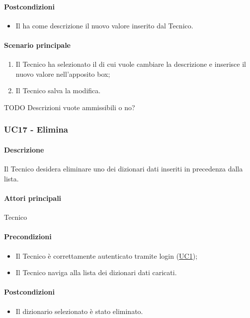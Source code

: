 \paragraph*{Postcondizioni}
\begin{itemize}
  \item Il  ha come descrizione il nuovo valore inserito dal Tecnico.
\end{itemize}
\paragraph*{Scenario principale}
\begin{enumerate}
  \item Il Tecnico ha selezionato il  di cui vuole cambiare la descrizione e inserisce il nuovo valore nell’apposito box;
  \item Il Tecnico salva la modifica.
\end{enumerate}

TODO Descrizioni vuote ammissibili o no?


\subsubsection{UC17 - Elimina }\label{UC17}
\paragraph*{Descrizione} Il Tecnico desidera eliminare uno dei dizionari dati inseriti in precedenza dalla lista.

\paragraph*{Attori principali} Tecnico

\paragraph*{Precondizioni}
\begin{itemize}
  \item Il Tecnico è correttamente autenticato tramite login (\hyperref[UC1]{UC1});
  \item Il Tecnico naviga alla lista dei dizionari dati caricati.  
\end{itemize}

\paragraph*{Postcondizioni}
\begin{itemize}
  \item Il dizionario selezionato è stato eliminato.
\end{itemize}

